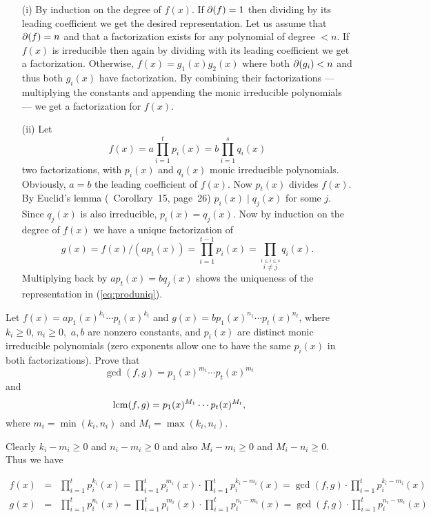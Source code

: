 \begin{myenumerate}
\begin{itemize}
 \item[(i)]
   By induction on the degree of \(f(x)\).
   If \(\partial(f)=1\) then dividing by its leading coefficient
   we get the desired representation.
   Let us assume that \(\partial(f)=n\) and that
   a factorization exists for any polynomial
   of degree \(<n\).
   If \(f(x)\) is irreducible then again by dividing with
   its leading coefficient  we get a factorization.
   Otherwise, \(f(x)=g_1(x)g_2(x)\) where both \(\partial(g_i)<n\)
   and thus both \(g_i(x)\) have factorization.
   By combining their factorizations --- multiplying the constants
   and appending the monic irreducible polynomials ---
   we get a factorization for \(f(x)\).
 \item[(ii)]
   Let
   \begin{equation} \label{eq:produniq}
    f(x)=a\prod_{i=1}^t p_i(x) = b\prod_{i=1}^s q_i(x)
   \end{equation}
   two factorizations, with \(p_i(x)\) and \(q_i(x)\) monic irreducible
   polynomials. Obviously, \(a=b\) the leading coefficient of \(f(x)\).
   Now \(p_t(x)\) divides \(f(x)\). By Euclid's lemma
   (\cite{Rotman98}~Corollary~15, page~26) \(p_i(x)\mid q_j(x)\)
   for some $j$. Since \(q_j(x)\) is also irreducible, \(p_i(x)=q_j(x)\).
   Now by induction on the degree of \(f(x)\)
   we have a unique factorization of
    \[g(x) = f(x)/(ap_t(x))
      = \prod_{i=1}^{t-1} p_i(x)
      = \prod_{\overset{1\leq i\leq s}{i\neq j}} q_i(x).\]
   Multiplying back by \(ap_t(x)=bq_j(x)\) shows the
   uniqueness of the representation in (\ref{eq:produniq}).
\end{itemize}


\item
\begin{excopy}
Let \(f(x)=ap_1(x)^{k_1} \cdots p_t(x)^{k_t}\)
and \(g(x)=bp_1(x)^{n_1} \cdots p_t(x)^{n_t}\),
where \(k_i\geq 0\), \(n_i\geq 0\),\, \(a,b\) are nonzero constants,
and \(p_i(x)\) are distinct monic irreducible polynomials (zero exponents
allow one to  have the same \(p_i(x)\) in both factorizations).
Prove that
\[\gcd(f,g) = p_1(x)^{m_1} \cdots p_t(x)^{m_t}\]
and
\[\mathop{\rm lcm}\nolimits(f,g) = p_1(x)^{M_1} \cdots p_t(x)^{M_t},\]
where \(m_i=\min(k_i,n_i)\)
and \(M_i=\max(k_i,n_i)\).
\end{excopy}


Clearly \(k_i-m_i\geq 0\) and \(n_i-m_i\geq 0\)
and also \(M_i-m_i\geq 0\) and \(M_i-n_i\geq 0\).
Thus we have

{
\newcommand{\prodit}[1]{\prod_{i=1}^t p_i^{#1}(x)}
\begin{eqnarray*}
f(x) & = & \prodit{k_i} = \prodit{m_i} \cdot \prodit{k_i-m_i}
       = \gcd(f,g)\cdot\prodit{k_i-m_i} \\
g(x) & = & \prodit{n_i} = \prodit{m_i} \cdot \prodit{n_i-m_i}
       = \gcd(f,g)\cdot\prodit{n_i-m_i} \\
\end{eqnarray*}

}
\end{myenumerate}
